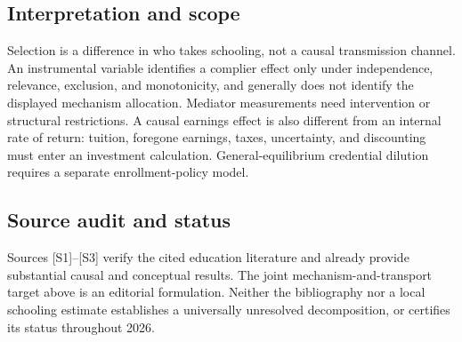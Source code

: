 \documentclass[11pt,a4paper]{article}
\begin{document}
\subsection*{Interpretation and scope}
Selection is a difference in who takes schooling, not a causal transmission channel. An instrumental variable identifies a complier effect only under independence, relevance, exclusion, and monotonicity, and generally does not identify the displayed mechanism allocation. Mediator measurements need intervention or structural restrictions. A causal earnings effect is also different from an internal rate of return: tuition, foregone earnings, taxes, uncertainty, and discounting must enter an investment calculation. General-equilibrium credential dilution requires a separate enrollment-policy model.
\subsection*{Source audit and status}
Sources [S1]--[S3] verify the cited education literature and already provide substantial causal and conceptual results. The joint mechanism-and-transport target above is an editorial formulation. Neither the bibliography nor a local schooling estimate establishes a universally unresolved decomposition, or certifies its status throughout 2026.
\end{document}
